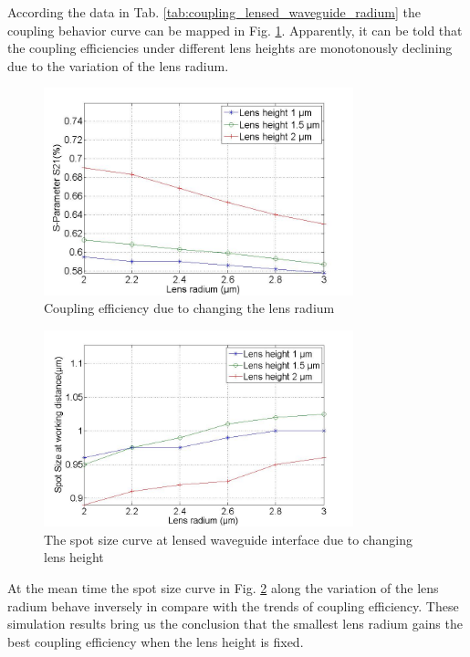 According the data in Tab. \ref{tab:coupling_lensed_waveguide_radium} the coupling behavior curve can be mapped in Fig. \ref{fig:coupling_lenses_curve_rxx}. Apparently, it can be told that the coupling efficiencies under different lens heights are monotonously declining due to the variation of the lens radium.
\begin{figure}[!ht]
\centering
\includegraphics[width=0.8\textwidth]{bilder/s21_fix_lens_height_rxx}
\caption{Coupling efficiency due to changing the lens radium}
\label{fig:coupling_lenses_curve_rxx}
\end{figure}
\begin{figure}[!ht]
\centering
\includegraphics[width=0.8\textwidth]{bilder/spot_fix_lens_height_rxx}
\caption{The spot size curve at lensed waveguide interface due to changing lens height}
\label{fig:lensed_guide_spot_size_curve_rxx}
\end{figure}
At the mean time the spot size curve in Fig. \ref{fig:lensed_guide_spot_size_curve_rxx} along the variation of the lens radium behave inversely in compare with the trends of coupling efficiency. These simulation results bring us the conclusion that the smallest lens radium gains the best coupling efficiency when the lens height is fixed. 
